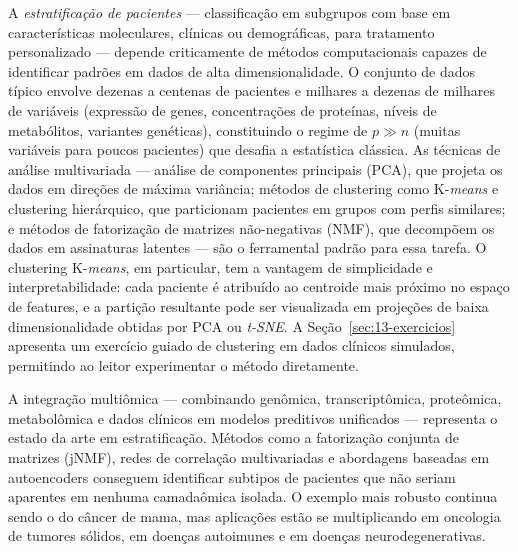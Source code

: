 A \emph{estratificação de pacientes} --- classificação em subgrupos com base em características moleculares, clínicas ou demográficas, para tratamento personalizado --- depende criticamente de métodos computacionais capazes de identificar padrões em dados de alta dimensionalidade. O conjunto de dados típico envolve dezenas a centenas de pacientes e milhares a dezenas de milhares de variáveis (expressão de genes, concentrações de proteínas, níveis de metabólitos, variantes genéticas), constituindo o regime de $p \gg n$ (muitas variáveis para poucos pacientes) que desafia a estatística clássica. As técnicas de análise multivariada --- análise de componentes principais (PCA), que projeta os dados em direções de máxima variância; métodos de clustering como K-\emph{means} e clustering hierárquico, que particionam pacientes em grupos com perfis similares; e métodos de fatorização de matrizes não-negativas (NMF), que decompõem os dados em assinaturas latentes --- são o ferramental padrão para essa tarefa. O clustering K-\emph{means}, em particular, tem a vantagem de simplicidade e interpretabilidade: cada paciente é atribuído ao centroide mais próximo no espaço de features, e a partição resultante pode ser visualizada em projeções de baixa dimensionalidade obtidas por PCA ou \emph{t-SNE}. A Seção~\ref{sec:13-exercicios} apresenta um exercício guiado de clustering em dados clínicos simulados, permitindo ao leitor experimentar o método diretamente.

A integração multiômica --- combinando genômica, transcriptômica, proteômica, metabolômica e dados clínicos em modelos preditivos unificados --- representa o estado da arte em estratificação. Métodos como a fatorização conjunta de matrizes (jNMF), redes de correlação multivariadas e abordagens baseadas em autoencoders conseguem identificar subtipos de pacientes que não seriam aparentes em nenhuma camadaômica isolada. O exemplo mais robusto continua sendo o do câncer de mama, mas aplicações estão se multiplicando em oncologia de tumores sólidos, em doenças autoimunes e em doenças neurodegenerativas.

